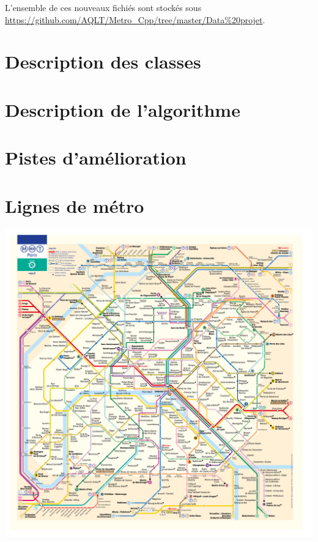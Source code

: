\documentclass[,french]{article}
\begin{document}
L'ensemble de ces nouveaux fichiés sont stockés sous
\url{https://github.com/AQLT/Metro_Cpp/tree/master/Data\%20projet}.

\hypertarget{sec:desc_classes}{%
\section{Description des classes}\label{sec:desc_classes}}

\hypertarget{sec:algo}{%
\section{Description de l'algorithme}\label{sec:algo}}

\hypertarget{sec:amelioration}{%
\section{Pistes d'amélioration}\label{sec:amelioration}}

\hypertarget{sec:lignes_metro}{%
\section{Lignes de métro}\label{sec:lignes_metro}}

\includegraphics{img/plan_lignes/Plan-Metro.pdf}
\end{document}
